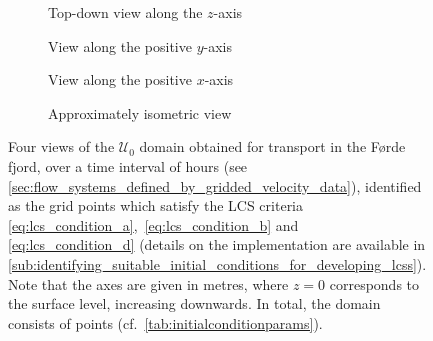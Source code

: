 \begin{figure}[htpb]
    \centering
    \hspace*{\fill}
    \begin{subfigure}[b]{0.43\textwidth}
        \centering
        \caption[]{{\small Top-down view along the $z$-axis}}
        \label{fig:fjord_abd_z}
    \end{subfigure}\hfill%
    \begin{subfigure}[b]{0.43\textwidth}
        \centering
        \caption[]{{\small View along the positive $y$-axis}}
        \label{fig:fjord_abd_y}
    \end{subfigure}
    \hspace*{\fill}

    \hspace*{\fill}
    \begin{subfigure}[b]{0.43\textwidth}
        \centering
        \caption[]{{\small View along the positive $x$-axis}}
        \label{fig:fjord_abd_x}
    \end{subfigure}\hfill%
    \begin{subfigure}[b]{0.43\textwidth}
        \centering
        \caption[]{{\small Approximately isometric view}}
        \label{fig:fjord_abd_isometric}
    \end{subfigure}%
    \hspace*{\fill}
    \caption[Four views of the $\mathcal{U}_{0}$ domain obtained for transport
    in the Førde fjord]
    {
        Four views of the $\mathcal{U}_{0}$ domain obtained for transport in
        the Førde fjord, over a time interval of  hours
        (see \cref{sec:flow_systems_defined_by_gridded_velocity_data}),
        identified as the grid points which satisfy the
        LCS criteria \eqref{eq:lcs_condition_a},~\eqref{eq:lcs_condition_b} and~
        \eqref{eq:lcs_condition_d} (details on the implementation are available
        in
        \cref{sub:identifying_suitable_initial_conditions_for_developing_lcss}).
        Note that the axes are given in metres, where $z=0$ corresponds to
        the surface level, increasing downwards. In total, the domain consists
        of  points (cf.\ \cref{tab:initialconditionparams}).
}
    \label{fig:fjord_abd}
\end{figure}

